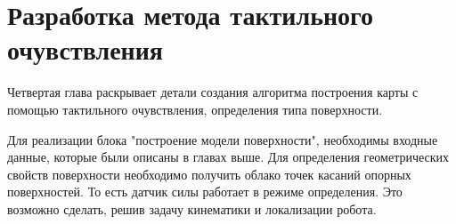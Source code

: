 \chapter{Разработка метода тактильного очувствления}\label{ch:ch4}


Четвертая глава раскрывает детали создания алгоритма построения карты с помощью тактильного очувствления, определения типа поверхности.

Для реализации блока "построение модели поверхности", необходимы входные данные, которые были  описаны в главах выше. Для определения геометрических свойств поверхности необходимо получить облако точек касаний опорных поверхностей. То есть датчик силы работает в режиме определения. Это возможно сделать, решив задачу кинематики и локализации робота.


